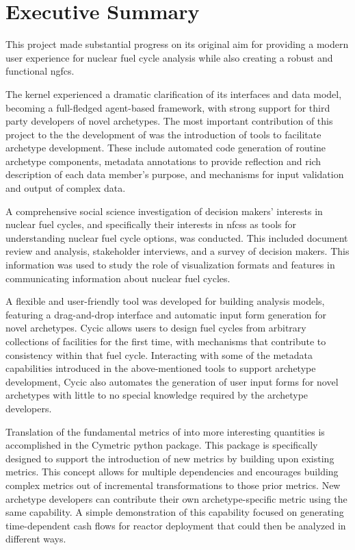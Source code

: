 \section*{Executive Summary}

This project made substantial progress on its original aim for providing a
modern user experience for nuclear fuel cycle analysis while also creating a
robust and functional \acrlong{ngfcs}.

The \Cyclus kernel experienced a dramatic clarification of its interfaces and
data model, becoming a full-fledged agent-based framework, with strong support
for third party developers of novel archetypes.  The most important
contribution of this project to the the development of \Cyclus was the
introduction of tools to facilitate archetype development.  These include
automated code generation of routine archetype components, metadata
annotations to provide reflection and rich description of each data member's
purpose, and mechanisms for input validation and output of complex data.

A comprehensive social science investigation of decision makers' interests in
nuclear fuel cycles, and specifically their interests in \glspl{nfcs} as tools
for understanding nuclear fuel cycle options, was conducted.  This included
document review and analysis, stakeholder interviews, and a survey of decision
makers.  This information was used to study the role of visualization formats
and features in communicating information about nuclear fuel cycles.

A flexible and user-friendly tool was developed for building \Cyclus analysis
models, featuring a drag-and-drop interface and automatic input form
generation for novel archetypes.  Cycic allows users to design fuel cycles
from arbitrary collections of facilities for the first time, with mechanisms
that contribute to consistency within that fuel cycle.  Interacting with some
of the metadata capabilities introduced in the above-mentioned tools to
support archetype development, Cycic also automates the generation of user
input forms for novel archetypes with little to no special knowledge required
by the archetype developers.

Translation of the fundamental metrics of \Cyclus into more interesting
quantities is accomplished in the Cymetric python package.  This package is
specifically designed to support the introduction of new metrics by building
upon existing metrics.  This concept allows for multiple dependencies and
encourages building complex metrics out of incremental transformations to
those prior metrics.  New archetype developers can contribute their own
archetype-specific metric using the same capability.  A simple demonstration
of this capability focused on generating time-dependent cash flows for reactor
deployment that could then be analyzed in different ways.




